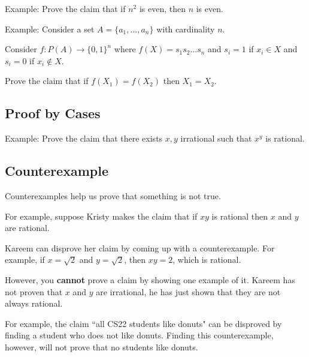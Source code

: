 \documentclass[12pt,letterpaper]{article}
\begin{document}
    Example: Prove the claim that if $n^2$ is even, then $n$ is even.
    
    \begin{mdframed}\vspace{2 cm}\end{mdframed}
     
    Example: Consider a set $A = \{a_1,...,a_n\}$ with cardinality $n$.
        
        Consider $f:P(A) \rightarrow \{0,1\}^n$ where $f(X) = s_1s_2...s_n$ and $s_i = 1$ if $x_i \in X$ and $s_i = 0$ if $x_i \not\in X$. 
        
        Prove the claim that if $f(X_1) = f(X_2)$ then $X_1 = X_2$. 
                
    \begin{mdframed}\vspace{2 cm}\end{mdframed}
    
    \subsection{Proof by Cases}
        
    Example: Prove the claim that there exists $x,y$ irrational such that $x^y$ is rational.
    \begin{mdframed}\vspace{2 cm}\end{mdframed}
    
    \subsection{Counterexample}
    
    Counterexamples help us prove that something is not true.

      For example, suppose Kristy makes the claim that if $xy$ is rational then $x$ and $y$ are rational.

      Kareem can disprove her claim by coming up with a counterexample. For example, if $x = \sqrt{2}$ and $y = \sqrt{2}$, then $xy = 2$, which is rational. 

      However, you \textbf{cannot} prove a claim by showing one example of it. Kareem has not proven that $x$ and $y$ are irrational, he has just shown that they are not always rational.

      For example, the claim ``all CS22 students like donuts" can be disproved by finding a student who does not like donuts. Finding this counterexample, however, will not prove that no students like donuts.
      
\end{document}
